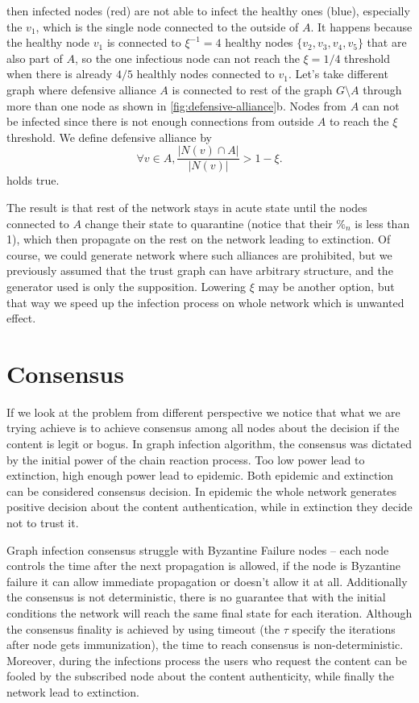 \documentclass[nostrict]{szablonPG}
\begin{document}
then infected nodes (red) are not able to infect the healthy ones (blue), especially the $v_1$, which is the single node connected to the outside of $A$. It happens because the healthy node $v_1$ is connected to $\xi^{-1} = 4$ healthy nodes $\{v_2,v_3,v_4,v_5\}$ that are also part of $A$, so the one infectious node can not reach the $\xi = 1/4$ threshold when there is already $4/5$ healthly nodes connected to $v_1$.
Let's take different graph where defensive alliance $A$ is connected to rest of the graph $G \setminus{} A$ through more than one node as shown in \ref{fig:defensive-alliance}b. Nodes from $A$ can not be infected since there is not enough connections from outside $A$ to reach the $\xi$ threshold. We define defensive alliance by \[\forall{v \in A}, \frac{|N(v) \cap A|}{|N(v)|} > 1 - \xi.\] holds true. 

The result is that rest of the network stays in acute state until the nodes connected to $A$ change their state to quarantine (notice that their $\%_n$ is less than 1), which then propagate on the rest on the network leading to extinction. Of course, we could generate network where such alliances are prohibited, but we previously assumed that the trust graph can have arbitrary structure, and the generator used is only the supposition.
Lowering $\xi$ may be another option, but that way we speed up the infection process on whole network which is unwanted effect. 


\section{Consensus}
If we look at the problem from different perspective we notice that what we are trying achieve is to achieve consensus among all nodes about the decision if the content is legit or bogus. In graph infection algorithm, the consensus was dictated by the initial power of the chain reaction process. Too low power lead to extinction, high enough power lead to epidemic. Both epidemic and extinction can be considered consensus decision. In epidemic the whole network generates positive decision about the content authentication, while in extinction they decide not to trust it. 

Graph infection consensus struggle with Byzantine Failure nodes -- each node controls the time after the next propagation is allowed, if the node is Byzantine failure it can allow immediate propagation or doesn't allow it at all. Additionally the consensus is not deterministic, there is no guarantee that with the initial conditions the network will reach the same final state for each iteration. Although the consensus finality is achieved by using timeout (the $\tau$ specify the iterations after node gets immunization), the time to reach consensus is non-deterministic. Moreover, during the infections process the users who request the content can be fooled by the subscribed node about the content authenticity, while finally the network lead to extinction.
\end{document}
